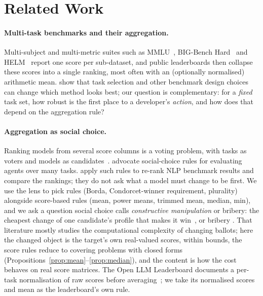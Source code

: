 \section{Related Work}
\label{sec:related}
\paragraph{Multi-task benchmarks and their aggregation.}
Multi-subject and multi-metric suites such as MMLU~\citep{hendrycks2020mmlu}, BIG-Bench Hard~\citep{suzgun2022bbh} and HELM~\citep{liang2022helm} report one score per sub-dataset, and public leaderboards then collapse these scores into a single ranking, most often with an (optionally normalised) arithmetic mean.
\citet{dehghani2021lottery} show that task selection and other benchmark design choices can change which method looks best; our question is complementary: for a \emph{fixed} task set, how robust is the first place to a developer's \emph{action}, and how does that depend on the aggregation rule?

\paragraph{Aggregation as social choice.}
Ranking models from several score columns is a voting problem, with tasks as voters and models as candidates~\citep{brandt2016handbook}. \citet{lanctot2023socialchoice} advocate social-choice rules for evaluating agents over many tasks. \citet{rofin2023votenrank} apply such rules to re-rank NLP benchmark results and compare the rankings; they do not ask what a model must change to be first. We use the lens to pick rules (Borda, Condorcet-winner requirement, plurality) alongside score-based rules (mean, power means, trimmed mean, median, min), and we ask a question social choice calls \emph{constructive manipulation} or bribery: the cheapest change of one candidate's profile that makes it win~\citep{bartholdi1989manipulating,faliszewski2016control}, or bribery \citep{faliszewski2009bribery}. That literature mostly studies the computational complexity of changing ballots; here the changed object is the target's own real-valued scores, within bounds, the score rules reduce to covering problems with closed forms (Propositions~\ref{prop:mean}--\ref{prop:median}), and the content is how the cost behaves on real score matrices. The Open LLM Leaderboard documents a per-task normalisation of raw scores before averaging~\citep{fourrier2024ollb}; we take its normalised scores and mean as the leaderboard's own rule.

